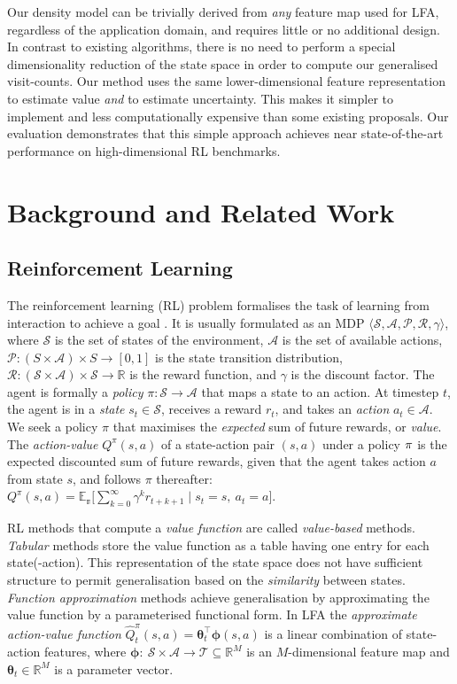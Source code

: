 \documentclass{article}
\theoremstyle{definition}
\theoremstyle{definition}
\theoremstyle{plain}
\theoremstyle{plain}
\theoremstyle{plain}
\begin{document}
Our density model can be trivially derived from \emph{any }feature
map used for LFA, regardless of the application domain, and requires
little or no additional design. In contrast to existing algorithms,
there is no need to perform a special dimensionality reduction of
the state space in order to compute our generalised visit-counts.
Our method uses the same lower-dimensional feature representation
to estimate value \emph{and }to estimate uncertainty. This makes it
simpler to implement and less computationally expensive than some
existing proposals. Our evaluation demonstrates that this simple approach
achieves near state-of-the-art performance on high-dimensional RL
benchmarks.


\section{Background and Related Work}


\subsection{Reinforcement Learning}

The reinforcement learning (RL) problem formalises the task of learning
from interaction to achieve a goal \cite{Sutton1998}. It is usually
formulated as an MDP $\langle\mathcal{S},\mathcal{A},\mathcal{P},\mathcal{R},\gamma\rangle$,
where $\mathcal{S}$ is the set of states of the environment, $\mathcal{A}$
is the set of available actions, $\mathcal{P}:(S\times\mathcal{A})\times S\to[0,1]$
is the state transition distribution, $\mathcal{R}:(\mathcal{S}\times\mathcal{A})\times\mathcal{S}\to\mathbb{R}$
is the reward function, and $\gamma$ is the discount factor. The
agent is formally a \emph{policy }$\pi:\mathcal{S}\to\mathcal{A}$
that maps a state to an action. At timestep $t$, the agent is in
a \emph{state} $s_{t}\in\mathcal{S}$, receives a reward $r_{t}$,
and takes an \emph{action} $a_{t}\in\mathcal{A}$. We seek a policy
$\pi$ that maximises the \emph{expected }sum of future rewards, or
\emph{value}. The\emph{ action-value }$Q^{\pi}(s,a)$ of a state-action
pair $(s,a)$ under a policy $\mbox{\ensuremath{\pi}}$ is the expected
discounted sum of future rewards, given that the agent takes action
$a$ from state $s$, and follows $\pi$ thereafter: $Q^{\pi}(s,a)=\mathbb{E_{\pi}}\big[\sum_{k=0}^{\infty}\gamma^{k}r_{t+k+1}\mid s_{t}=s,\ a_{t}=a\big]$. 

RL methods that compute a \emph{value function }are called \emph{value-based}
methods. \emph{Tabular} methods store the value function as a table
having one entry for each state(-action).\emph{ }This representation
of the state space does not have sufficient structure to permit generalisation
based on the \emph{similarity} between states. \emph{Function approximation}
methods achieve generalisation by approximating the value function\emph{
}by a parameterised functional form. In LFA the \emph{approximate
action-value function} $\hat{Q}_{t}^{\pi}(s,a)=\bm{\theta}_{t}^{\top}\bm{\phi}(s,a)$
is a linear combination of state-action features, where $\bm{\phi}:\ \mathcal{S}\times\mathcal{A}\to\mathcal{T}\subseteq\mathbb{R}^{M}$
is an $M$-dimensional feature map and $\bm{\theta}_{t}\in\mathbb{R}^{M}$
is a parameter vector. 
\end{document}
